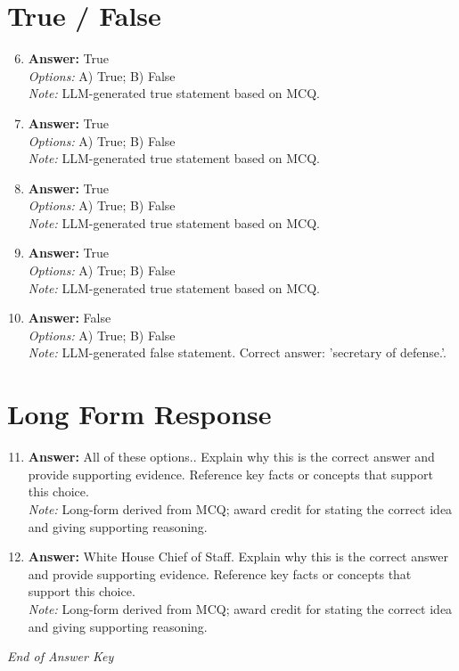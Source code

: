 \documentclass[12pt]{article}
\begin{document}
\section*{True / False}
\begin{enumerate}[label=\arabic*.]
\setcounter{enumi}{5}
\item \textbf{Answer:} True
\\ \textit{Options:} A) True; B) False
\\ \textit{Note:} LLM-generated true statement based on MCQ.
\item \textbf{Answer:} True
\\ \textit{Options:} A) True; B) False
\\ \textit{Note:} LLM-generated true statement based on MCQ.
\item \textbf{Answer:} True
\\ \textit{Options:} A) True; B) False
\\ \textit{Note:} LLM-generated true statement based on MCQ.
\item \textbf{Answer:} True
\\ \textit{Options:} A) True; B) False
\\ \textit{Note:} LLM-generated true statement based on MCQ.
\item \textbf{Answer:} False
\\ \textit{Options:} A) True; B) False
\\ \textit{Note:} LLM-generated false statement. Correct answer: 'secretary of defense.'.
\end{enumerate}

\section*{Long Form Response}
\begin{enumerate}[label=\arabic*.]
\setcounter{enumi}{10}
\item \textbf{Answer:} All of these options.. Explain why this is the correct answer and provide supporting evidence. Reference key facts or concepts that support this choice.
\\ \textit{Note:} Long-form derived from MCQ; award credit for stating the correct idea and giving supporting reasoning.
\item \textbf{Answer:} White House Chief of Staff. Explain why this is the correct answer and provide supporting evidence. Reference key facts or concepts that support this choice.
\\ \textit{Note:} Long-form derived from MCQ; award credit for stating the correct idea and giving supporting reasoning.
\end{enumerate}

\vfill
\noindent\textit{End of Answer Key}
\end{document}
